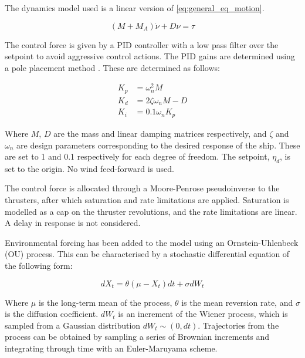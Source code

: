 The dynamics model used is a linear version of \eqref{eq:general_eq_motion}.

\begin{equation}
    (M + M_A) \dot{\nu} + D \nu = \tau
\end{equation}

The control force is given by a PID controller with a low pass filter over the setpoint to avoid aggressive control
actions.  The PID gains are determined using a pole placement method \parencite{fossenHandbookMarineCraft2014}. These
are determined as follows:

\begin{equation}
    \begin{aligned}
        K_p &= \omega_n^2 M \\
        K_d &= 2 \zeta \omega_n M - D \\
        K_i &= 0.1 \omega_n K_p
    \end{aligned}
\end{equation}

Where \(M\), \(D\) are the mass and linear damping matrices respectively, and \(\zeta\) and \(\omega_n\) are design
parameters corresponding to the desired response of the ship. These are set to 1 and 0.1 respectively for each degree of
freedom. The setpoint, \(\eta_d\), is set to the origin. No wind feed-forward is used.

The control force is allocated through a Moore-Penrose pseudoinverse to the thrusters, after which saturation
and rate limitations are applied. Saturation is modelled as a cap on the thruster revolutions, and the rate limitations
are linear. A delay in response is not considered. 

Environmental forcing has been added to the model using an Ornstein-Uhlenbeck (OU) process. This can be characterised by a
stochastic differential equation of the following form:

\begin{equation}
    dX_t = \theta (\mu - X_t)dt + \sigma dW_t
\end{equation}

Where \(\mu\) is the long-term mean of the process, \(\theta\) is the mean reversion rate, and \(\sigma\) is the
diffusion coefficient. \(dW_t\) is an increment of the Wiener process, which is sampled from a Gaussian distribution
\(dW_t \sim (0, dt)\). Trajectories from the process can be obtained by sampling a series of Brownian increments and
integrating through time with an Euler-Maruyama scheme. 

